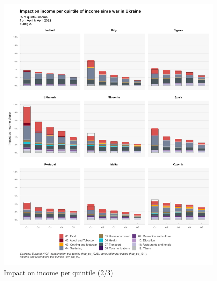 \documentclass[
  9pt,
  a4paper,
  DIV=11,
  numbers=noendperiod,
  oneside]{scrartcl}
\begin{document}
\begin{figure}

\caption{Impact on income per quintile (2/3)}

{\centering \includegraphics[width=17cm,height=\textheight]{../svg/coicop_l1_1y_2.png}

}

\end{figure}
\end{document}
